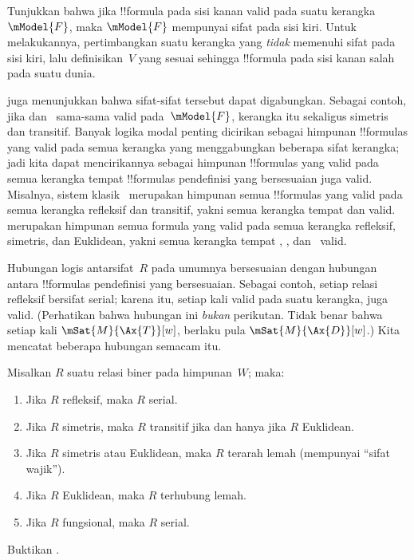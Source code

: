 \documentclass[../../../include/open-logic-section]{subfiles}
\begin{document}
\begin{prob}
Tunjukkan bahwa jika !!{formula} pada sisi kanan
 valid pada suatu
kerangka~$\mModel{F}$, maka $\mModel{F}$ mempunyai sifat pada sisi kiri.
Untuk melakukannya, pertimbangkan suatu kerangka yang \emph{tidak} memenuhi
sifat pada sisi kiri, lalu definisikan~$V$ yang sesuai sehingga !!{formula}
pada sisi kanan salah pada suatu dunia.
\end{prob}

 juga menunjukkan bahwa sifat-sifat tersebut
dapat digabungkan. Sebagai contoh, jika  dan~ sama-sama valid
pada~$\mModel{F}$, kerangka itu sekaligus simetris dan transitif. Banyak logika
modal penting dicirikan sebagai himpunan !!{formula}s yang valid pada semua
kerangka yang menggabungkan beberapa sifat kerangka; jadi kita dapat
mencirikannya sebagai himpunan !!{formula}s yang valid pada semua kerangka
tempat !!{formula}s pendefinisi yang bersesuaian juga valid. Misalnya, sistem
klasik~ merupakan himpunan semua !!{formula}s yang valid pada semua
kerangka refleksif dan transitif, yakni semua kerangka tempat  dan
 valid.  merupakan himpunan semua formula yang valid pada semua
kerangka refleksif, simetris, dan Euklidean, yakni semua kerangka tempat
, , dan~ valid.

Hubungan logis antarsifat~$R$ pada umumnya bersesuaian dengan hubungan antara
!!{formula}s pendefinisi yang bersesuaian. Sebagai contoh, setiap relasi
refleksif bersifat serial; karena itu, setiap kali  valid pada suatu
kerangka,  juga valid. (Perhatikan bahwa hubungan ini \emph{bukan}
perikutan. Tidak benar bahwa setiap kali $\mSat{M}{\Ax{T}}[w]$, berlaku pula
$\mSat{M}{\Ax{D}}[w]$.) Kita mencatat beberapa hubungan semacam itu.

\begin{prop}
  Misalkan $R$ suatu relasi biner pada himpunan~$W$; maka:
  \begin{enumerate}
  \item Jika $R$ refleksif, maka $R$ serial.
  \item Jika $R$ simetris, maka $R$ transitif jika dan hanya jika $R$
    Euklidean.
  \item Jika $R$ simetris atau Euklidean, maka $R$ terarah lemah (mempunyai
    ``sifat wajik'').
  \item Jika $R$ Euklidean, maka $R$ terhubung lemah.
  \item Jika $R$ fungsional, maka $R$ serial.
  \end{enumerate}
\end{prop}

\begin{prob}
  Buktikan .
\end{prob}
\end{document}
